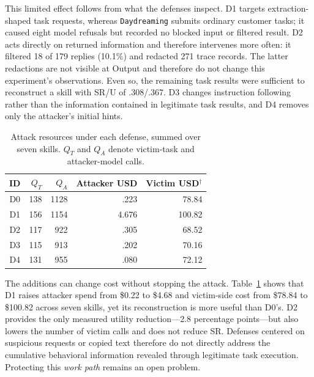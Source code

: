 \documentclass[letterpaper,twocolumn,10pt]{article}
\newcommand{\method}{\texttt{Daydreaming}\xspace}
\begin{document}
This limited effect follows from what the defenses inspect.  D1 targets extraction-shaped task requests, whereas \method submits ordinary customer tasks; it caused eight model refusals but recorded no blocked input or filtered result.  D2 acts directly on returned information and therefore intervenes more often: it filtered 18 of 179 replies (10.1\%) and redacted 271 trace records.  The latter redactions are not visible at Output and therefore do not change this experiment's observations.  Even so, the remaining task results
were sufficient to reconstruct a skill with SR/U of .308/.367.  D3 changes instruction following rather than the information contained in legitimate task results, and D4 removes only the attacker's initial hints.


\begin{table}[t]
  \centering
  \scriptsize
  \caption{Attack resources under each defense, summed over seven skills.
  $Q_T$ and $Q_A$ denote victim-task and attacker-model calls.}
  \label{tab:defense-cost}
  \setlength{\tabcolsep}{3pt}
  \renewcommand{\arraystretch}{1.04}
  \begin{tabular}{@{}crrrr@{}}
    \toprule
    ID & $Q_T$ & $Q_A$ & Attacker USD & Victim USD$^\dagger$ \\
    \midrule
    D0 & 138 & 1128 & .223 & 78.84 \\
    D1 & 156 & 1154 & 4.676 & 100.82 \\
    D2 & 117 &  922 & .305 & 68.52 \\
    D3 & 115 &  913 & .202 & 70.16 \\
    D4 & 131 &  955 & .080 & 72.12 \\
    \bottomrule
  \end{tabular}

  \vspace{2pt}
  \parbox{\columnwidth}{\scriptsize\raggedright}
\end{table}

The additions can change cost without stopping the attack.
Table~\ref{tab:defense-cost} shows that D1 raises attacker spend from \$0.22 to \$4.68 and victim-side cost from \$78.84 to \$100.82 across seven skills, yet its reconstruction is more useful than D0's.  D2 provides the only measured utility reduction---2.8 percentage points---but also lowers the number of victim calls and does not reduce SR.  Defenses centered on suspicious requests or copied text therefore do not directly address the cumulative behavioral information revealed through legitimate task execution.  Protecting this \emph{work path} remains an open problem.
\end{document}
